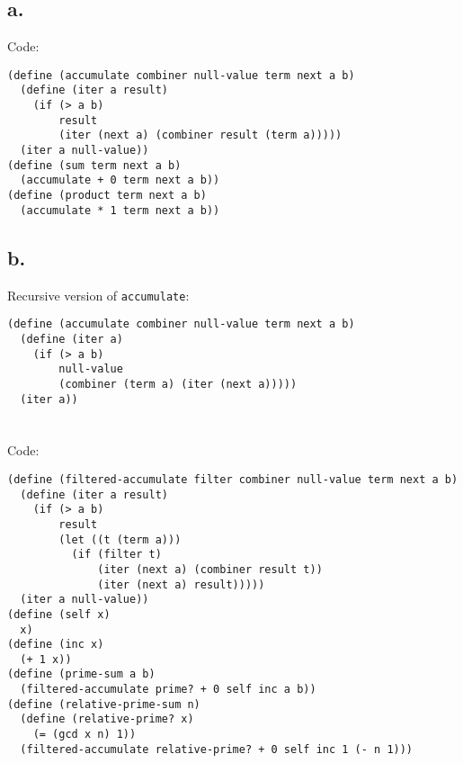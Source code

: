 \documentclass[../main.tex]{subfiles}
\begin{document}
\subsection*{a.}

Code:

\begin{lstlisting}
(define (accumulate combiner null-value term next a b)
  (define (iter a result)
    (if (> a b)
        result
        (iter (next a) (combiner result (term a)))))
  (iter a null-value))
(define (sum term next a b)
  (accumulate + 0 term next a b))
(define (product term next a b)
  (accumulate * 1 term next a b))
\end{lstlisting}

\subsection*{b.}

Recursive version of \lstinline{accumulate}:

\begin{lstlisting}
(define (accumulate combiner null-value term next a b)
  (define (iter a)
    (if (> a b)
        null-value
        (combiner (term a) (iter (next a)))))
  (iter a))
\end{lstlisting}


\section{}

Code:

\begin{lstlisting}
(define (filtered-accumulate filter combiner null-value term next a b)
  (define (iter a result)
    (if (> a b)
        result
        (let ((t (term a)))
          (if (filter t)
              (iter (next a) (combiner result t))
              (iter (next a) result)))))
  (iter a null-value))
(define (self x)
  x)
(define (inc x)
  (+ 1 x))
(define (prime-sum a b)
  (filtered-accumulate prime? + 0 self inc a b))
(define (relative-prime-sum n)
  (define (relative-prime? x)
    (= (gcd x n) 1))
  (filtered-accumulate relative-prime? + 0 self inc 1 (- n 1)))
\end{lstlisting}


\section{}
\end{document}
